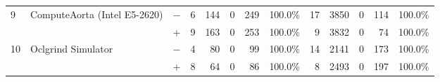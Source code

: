 \begin{tabular}{lll | rrrrr | rrrrr }
\hline
\multirow{ 2}{*}{9} & \multirow{ 2}{*}{ComputeAorta (Intel E5-2620)} & $-$ & 6 & 144 & 0 & 249 & 100.0\%       & 17 & 3850 & 0 & 114 & 100.0\% \\& & $+$ & 9 & 163 & 0 & 253 & 100.0\% & 9 & 3832 & 0 & 74 & 100.0\% \\
\hline
\multirow{ 2}{*}{10} & \multirow{ 2}{*}{Oclgrind Simulator} & $-$ & 4 & 80 & 0 & 99 & 100.0\%       & 14 & 2141 & 0 & 173 & 100.0\% \\& & $+$ & 8 & 64 & 0 & 86 & 100.0\% & 8 & 2493 & 0 & 197 & 100.0\% \\
  \bottomrule
\end{tabular}

